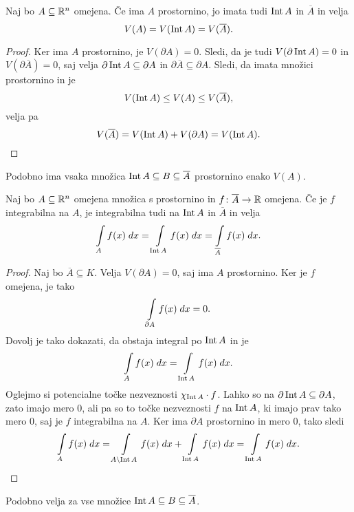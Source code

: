 \begin{trditev}
Naj bo $A \subseteq \mathbb{R}^n$ omejena. Če ima $A$ prostornino, jo imata
tudi $\operatorname{Int} A$ in $\overline{A}$ in velja
\[
V(A) = V(\operatorname{Int} A) = V(\overline{A}).
\]
\end{trditev}

\begin{proof}
Ker ima $A$ prostornino, je $V(\partial A) = 0$. Sledi, da je tudi
$V(\partial \operatorname{Int} A) = 0$ in $V(\partial\overline{A}) = 0$, saj
velja $\partial \operatorname{Int} A \subseteq \partial A$ in
$\partial \overline{A} \subseteq \partial A$. Sledi, da imata
množici prostornino in je
\[
V(\operatorname{Int} A) \leq V(A) \leq V(\overline{A}),
\]
velja pa
\[
V(\overline{A}) = V(\operatorname{Int} A) + V(\partial A) = V(\operatorname{Int} A). \qedhere
\]
\end{proof}

\begin{opomba}
Podobno ima vsaka množica
$\operatorname{Int} A \subseteq B \subseteq \overline{A}$ prostornino enako
$V(A)$.
\end{opomba}

\begin{trditev}
Naj bo $A \subseteq \mathbb{R}^n$ omejena množica s prostornino in
$f \colon \overline{A} \to \mathbb{R}$ omejena. Če je $f$ integrabilna na
$A$, je integrabilna tudi na $\operatorname{Int} A$ in $\overline{A}$ in velja
\[
\int\limits_A f(x)\;dx = \int\limits_{\operatorname{Int} A} f(x)\;dx =
\int\limits_{\overline{A}} f(x)\;dx.
\]
\end{trditev}

\begin{proof}
Naj bo $\overline{A} \subseteq K$. Velja $V(\partial A) = 0$, saj
ima $A$ prostornino. Ker je $f$ omejena, je tako
\[
\int\limits_{\partial A} f(x)\;dx = 0.
\]
Dovolj je tako dokazati, da obstaja integral po $\operatorname{Int} A$ in je
\[
\int\limits_A f(x)\;dx = \int\limits_{\operatorname{Int} A} f(x)\;dx.
\]
Oglejmo si potencialne točke nezveznosti $\chi_{\operatorname{Int} A} \cdot f$.
Lahko so na $\partial \operatorname{Int} A \subseteq \partial A$, zato imajo mero
$0$, ali pa so to točke nezveznosti $f$ na $\operatorname{Int} A$, ki imajo prav
tako mero $0$, saj je $f$ integrabilna na $A$. Ker ima $\partial A$
prostornino in mero $0$, tako sledi
\[
\int\limits_A f(x)\;dx =
\int\limits_{A \setminus \operatorname{Int} A} f(x)\;dx + \int\limits_{\operatorname{Int} A} f(x)\;dx =
\int\limits_{\operatorname{Int} A} f(x)\;dx. \qedhere
\]
\end{proof}

\begin{opomba}
Podobno velja za vse množice
$\operatorname{Int} A \subseteq B \subseteq \overline{A}$.
\end{opomba}

\newpage

